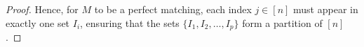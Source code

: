 \begin{proof}
\begin{comment}
    By the inductive construction, if $j = i_q$ for some $q$, then either:
    \begin{enumerate}
        \item $j = i_1$ and $b_j = M(s_i)$, or
        \item $j = i_k$ for $k > 1$ and $b_j = M(a_{i_{k-1}})$.
    \end{enumerate}
    Similarly, if $j = z_l$ for some $l$, then either:
    \begin{enumerate}
        \item $j = z_1$ and $b_j = M(s_z)$, or
        \item $j = z_l$ for $l > 1$ and $b_j = M(a_{z_{l-1}})$.
    \end{enumerate}
    Since $i \neq z$, we have $s_i \neq s_z$. If $j$ appears in both sets, then by the inductive construction:
    \begin{itemize}
        \item In set $I_i$: node $b_j$ is part of a matching path that originates from source $s_i$
        \item In set $I_z$: node $b_j$ is part of a matching path that originates from source $s_z$
    \end{itemize}
    This means $b_j$ would need to be connected to two different matching paths. However, in a matching, each node can be incident to at most one edge. Therefore, $b_j$ cannot be matched to multiple nodes, which contradicts the definition of a matching. Hence, if $I_i \neq I_z$, then $I_i \cap I_z = \emptyset$.
    \end{comment}

    Hence, for $M$ to be a perfect matching, each index $j \in [n]$ must appear in exactly one set $I_i$, ensuring that the sets $\{I_1, I_2, \ldots, I_p\}$ form a partition of $[n]$.
\end{proof}

